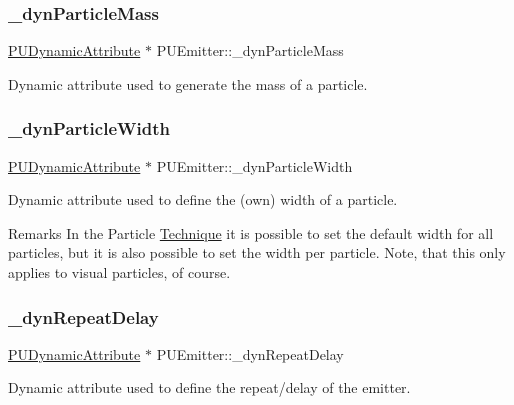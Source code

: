 \subsubsection{\texorpdfstring{\+\_\+dyn\+Particle\+Mass}{\_dynParticleMass}}
{\footnotesize\ttfamily \hyperlink{classPUDynamicAttribute}{P\+U\+Dynamic\+Attribute} $\ast$ P\+U\+Emitter\+::\+\_\+dyn\+Particle\+Mass\hspace{0.3cm}{\ttfamily [protected]}}

Dynamic attribute used to generate the mass of a particle. \mbox{\label{classPUEmitter_adf042602104b679a03288cf78c2d0422}} 
\subsubsection{\texorpdfstring{\+\_\+dyn\+Particle\+Width}{\_dynParticleWidth}}
{\footnotesize\ttfamily \hyperlink{classPUDynamicAttribute}{P\+U\+Dynamic\+Attribute} $\ast$ P\+U\+Emitter\+::\+\_\+dyn\+Particle\+Width\hspace{0.3cm}{\ttfamily [protected]}}

Dynamic attribute used to define the (own) width of a particle. \begin{DoxyRemark}{Remarks}
In the Particle \hyperlink{classTechnique}{Technique} it is possible to set the default width for all particles, but it is also possible to set the width per particle. Note, that this only applies to visual particles, of course. 
\end{DoxyRemark}
\mbox{\label{classPUEmitter_a3932e1e7092421222aaa6fc0cda8161b}} 
\subsubsection{\texorpdfstring{\+\_\+dyn\+Repeat\+Delay}{\_dynRepeatDelay}}
{\footnotesize\ttfamily \hyperlink{classPUDynamicAttribute}{P\+U\+Dynamic\+Attribute} $\ast$ P\+U\+Emitter\+::\+\_\+dyn\+Repeat\+Delay\hspace{0.3cm}{\ttfamily [protected]}}

Dynamic attribute used to define the repeat/delay of the emitter. \mbox{\label{classPUEmitter_a45b6804e8951590737ec796caa3c4277}} 
